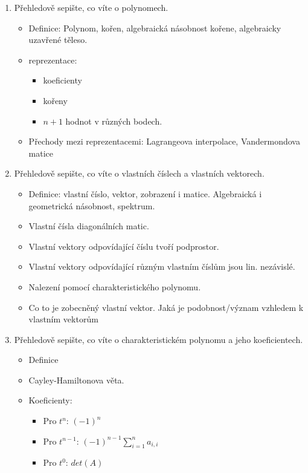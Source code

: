\documentclass[10pt,a4paper]{article}
\theoremstyle{plain}
\begin{document}
\begin{enumerate}
\item Přehledově sepište, co víte o polynomech.
\begin{itemize}
\item Definice: Polynom, kořen, algebraická násobnost kořene, algebraicky uzavřené těleso.
\item reprezentace:
\begin{itemize}[label=+]
\item koeficienty
\item kořeny
\item $n+1$ hodnot v různých bodech.
\end{itemize}
\item Přechody mezi reprezentacemi: Lagrangeova interpolace, Vandermondova matice

\end{itemize}
\item Přehledově sepište, co víte o vlastních číslech a vlastních vektorech.
\begin{itemize}
\item Definice: vlastní číslo, vektor, zobrazení i matice. Algebraická i geometrická násobnost, spektrum.
\item Vlastní čísla diagonálních matic.
\item Vlastní vektory odpovídající číslu tvoří podprostor.
\item Vlastní vektory odpovídající různým vlastním číslům jsou lin. nezávislé.
\item Nalezení pomocí charakteristického polynomu.
\item Co to je zobecněný vlastní vektor. Jaká je podobnost/význam vzhledem k vlastním vektorům
\end{itemize}


\item Přehledově sepište, co víte o charakteristickém polynomu a jeho koeficientech.
\begin{itemize}
\item Definice
\item Cayley-Hamiltonova věta.
\item Koeficienty: \begin{itemize}[label=+]
\item Pro $t^n$: $(-1)^n$
\item Pro $t^{n-1}$: $(-1)^{n-1} \sum_{i=1}^n a_{i,i}$
\item  Pro $t^0$: $det(A)$
\end{itemize}
\end{itemize}



\end{enumerate}
\end{document}
